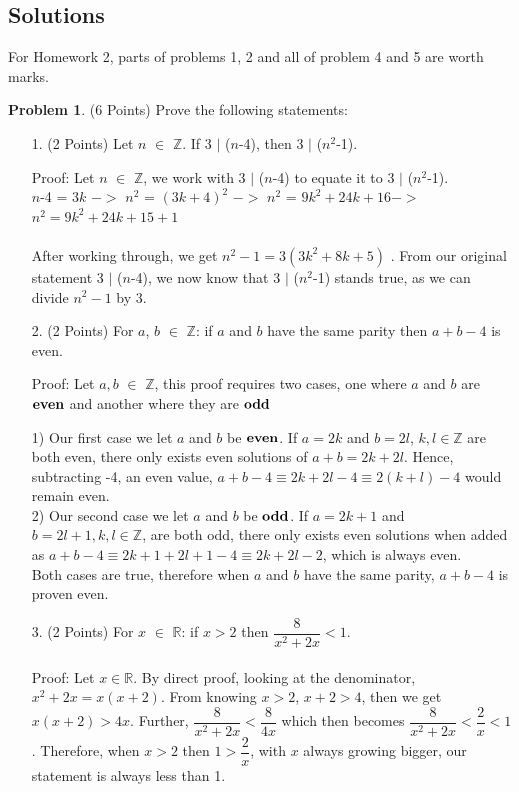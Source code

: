 \documentclass[letterpaper, 12pt]{article}
\newcommand{\hw}{2} %
\theoremstyle{definition}
\newtheorem{pb}{Problem} %
\begin{document}
\subsection*{Solutions}
For Homework \hw, parts of problems 1, 2 and all of problem 4 and 5 are worth marks.
\vspace{5mm}
\begin{pb} (6 Points) Prove the following statements:
\begin{enumerate}

    \item [1.] (2 Points) Let $n$ $\in$ $\mathbb{Z}$. If 3 $|$ ($n$-4), then 3 $|$ ($n^2$-1).
    
    Proof: Let $n$ $\in$ $\mathbb{Z}$, we work with 3 $|$ ($n$-4) to equate it to 3 $|$ ($n^2$-1).\\
    $n$-4 = 3$k$ $ ->$
    $n^2$ = $(3k + 4)^2$ $->$ $n^2$ = $9k^2 + 24k + 16 ->$ $n^2 = 9k^2 + 24k + 15 + 1$\\\\
    After working through, we get $n^2 - 1  = 3(3k^2 + 8k + 5)$ . From our original statement 3 $|$ ($n$-4), we now know that 3 $|$ ($n^2$-1) stands true, as we can divide $n^2-1$ by 3. 
    \vspace{5mm}
    \item [2.] (2 Points) For $a$, $b$ $\in$ $\mathbb{Z}$: if $a$ and $b$ have the same parity then $a + b - 4$ is even.
    
    Proof: Let $a, b$ $\in$ $\mathbb{Z}$, this proof requires two cases, one where $a$ and $b$ are $\bold{even}$ and another where they are $\bold{odd}$

    1) Our first case we let $a$ and $b$ be $\bold{even}$. If $a = 2k$ and $b = 2l$, $k, l \in \mathbb{Z}$ are both even, there only exists even solutions of $a + b = 2k + 2l$. Hence, subtracting -4, an even value, $a+b-4 \equiv 2k + 2l -4 \equiv 2(k + l) - 4$ would remain even.\\
    
    2) Our second case we let $a$ and $b$ be $\bold{odd}$. If $a = 2k + 1$ and $b = 2l + 1, k, l \in \mathbb{Z}$, are both odd, there only exists even solutions when added as $a + b - 4 \equiv 2k + 1 + 2l + 1 -4 \equiv 2k + 2l -2$, which is always even.\\

    Both cases are true, therefore when $a$ and $b$ have the same parity, $a+b-4$ is proven even.

    \vspace{5mm}
    \item [3.] (2 Points) For $x$ $\in$ $\mathbb{R}$: if $x > 2$ then $\dfrac{8}{x^2 + 2x} < 1$.\\\\
    Proof: Let $x \in \mathbb{R}$. By direct proof, looking at the denominator, $x^2 + 2x = x(x+2)$. 
    From knowing $x>2$, $x + 2 > 4$, then we get $x(x+2) > 4x$. Further, $\dfrac{8}{x^2 + 2x} < \dfrac{8}{4x}$ which then becomes $\dfrac{8}{x^2 + 2x} < \dfrac{2}{x} < 1$. Therefore, when $x > 2$ then $1 > \dfrac{2}{x}$, with $x$ always growing bigger, our statement is always less than 1.

\end{enumerate}   
\end{pb}
\end{document}
